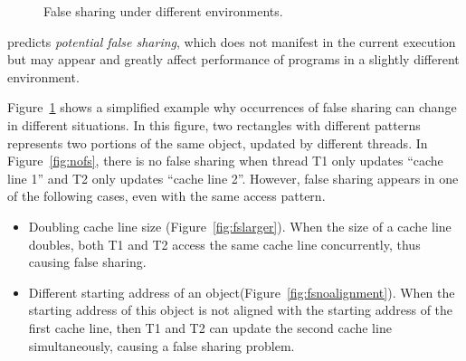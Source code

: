 \begin{figure}
\begin{center} 
%
\hspace{10pt}
%
\hspace{10pt}
%
\end{center}
\caption{False sharing under different environments.}
\label{fig:potentialfalsesharing}
\end{figure}

\Predator{} predicts {\it potential false sharing}, which does not manifest in the current execution but may appear and greatly affect performance of programs in a slightly different environment.

Figure~\ref{fig:potentialfalsesharing} shows a simplified example why occurrences of false sharing can change in different situations. 
In this figure, two rectangles with different patterns
represents two portions of the same object, updated by different threads. In Figure~\ref{fig:nofs}, there is no false sharing when thread T1 only updates 
``cache line 1'' and T2 only updates ``cache line 2''.
However, false sharing appears in one of the following cases, even with the same
access pattern. 

\begin{itemize}
\item
Doubling cache line size (Figure~\ref{fig:fslarger}). When the size of a cache line doubles, both T1 and T2 access the same cache line concurrently, thus causing false sharing.

\item
Different starting address of an object(Figure~\ref{fig:fsnoalignment}).  
When the starting address of this object is not aligned with the starting address of the first cache line, then T1 and T2 can update the second cache line simultaneously, causing a false sharing problem. 
\end{itemize} 

